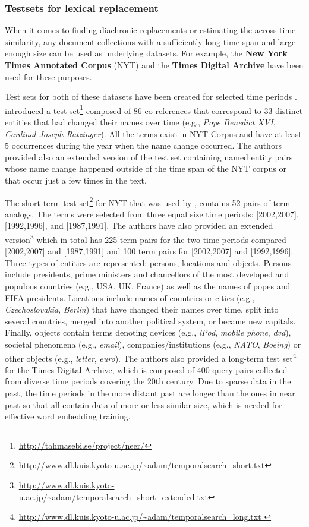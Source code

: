 \documentclass[output=paper]{langsci/langscibook}
\begin{document}
\subsubsection{Testsets for lexical replacement}
When it comes to finding diachronic replacements or estimating the across-time similarity, any document collections with a sufficiently long time span and large enough size can be used as underlying datasets. For example, the \textbf{New York Times Annotated Corpus} (NYT) and the \textbf{Times Digital Archive} have been used for these purposes. 

Test sets for both of these datasets have been created for selected time periods \citep{tahmasebi2012neer, zhang2016past}. \citet{tahmasebi2012neer} introduced a test set\footnote{\url{http://tahmasebi.se/project/neer/}} composed of 86 co-references that correspond to 33 distinct entities that had changed their names over time (e.g.,  \emph{Pope Benedict XVI}, \emph{Cardinal Joseph Ratzinger}). All the terms exist in NYT Corpus and have at least 5 occurrences during the year when the name change occurred. The authors provided also an extended version of the test set containing named entity pairs whose name change happened outside of the time span of the NYT corpus or that occur just a few times in the text.

The short-term test set\footnote{\url{http://www.dl.kuis.kyoto-u.ac.jp/~adam/temporalsearch_short.txt}} for NYT that was used by \citet{zhang2016past}, contains 52 pairs of term analogs. The terms were selected from three equal size time periods: [2002,2007], [1992,1996], and [1987,1991]. The authors have also provided an extended version\footnote{\url{http://www.dl.kuis.kyoto-u.ac.jp/~adam/temporalsearch_short_extended.txt}}\citep{zhang:2017:tar:3132847.3132917} which in total has 225 term pairs for the two time periods compared [2002,2007] and [1987,1991] and 100 term pairs for [2002,2007] and [1992,1996]. Three types of entities are represented: persons, locations and objects. Persons include presidents,
prime ministers and chancellors of the most developed and populous countries (e.g.,  USA, UK, France) as well as the names of
popes and FIFA presidents. Locations include names of countries or cities (e.g.,  \emph{Czechoslovakia}, \emph{Berlin}) that have changed their names over time, split into several countries, merged into another political system, or became new capitals. Finally, objects contain terms denoting devices (e.g.,  \emph{iPod}, \emph{mobile phone}, \emph{dvd}), societal phenomena (e.g.,  \emph{email}), companies/institutions (e.g.,  \emph{NATO}, \emph{Boeing}) or other objects (e.g.,  \emph{letter}, \emph{euro}).
The authors also provided a long-term test set\footnote{\url{http://www.dl.kuis.kyoto-u.ac.jp/~adam/temporalsearch_long.txt
}} for the Times Digital Archive, which is composed of 400 query pairs collected from diverse time periods covering the 20th century. Due to sparse data in the past, the time periods in the more distant past are longer than the ones in near past so that all contain data of more or less similar size, which is needed for effective word embedding training.
\end{document}
